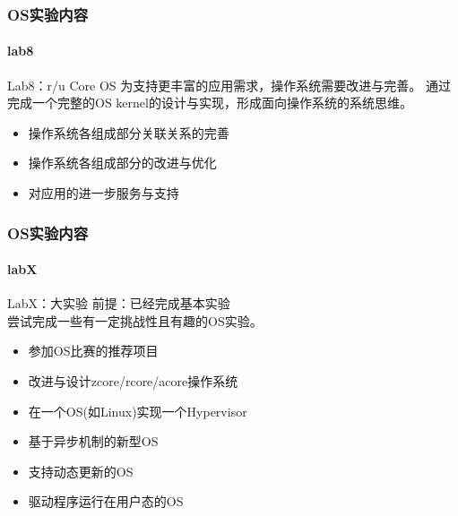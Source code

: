 \begin{frame}
\frametitle{OS实验内容}
\framesubtitle{lab8}

\begin{block}{Lab8：r/u Core OS}
为支持更丰富的应用需求，操作系统需要改进与完善。
通过完成一个完整的OS kernel的设计与实现，形成面向操作系统的系统思维。
\end{block}

\begin{itemize}
    \item 操作系统各组成部分关联关系的完善
    \item 操作系统各组成部分的改进与优化
    \item 对应用的进一步服务与支持
\end{itemize}

\end{frame}


\begin{frame}[plain]
\frametitle{OS实验内容}
\framesubtitle{labX}

\begin{block}{LabX：大实验}
前提：已经完成基本实验 \\
尝试完成一些有一定挑战性且有趣的OS实验。
\end{block}

\begin{itemize}
    \item 参加OS比赛的推荐项目
    \item 改进与设计zcore/rcore/acore操作系统
    \item 在一个OS(如Linux)实现一个Hypervisor
    \item 基于异步机制的新型OS
    \item 支持动态更新的OS
    \item 驱动程序运行在用户态的OS
\end{itemize}

\end{frame}


